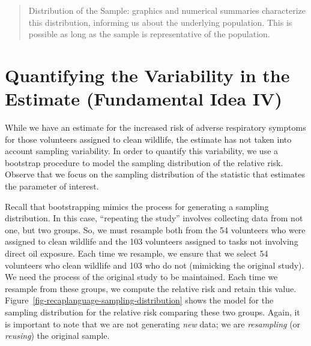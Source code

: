 \documentclass[
  letterpaper,
  DIV=11,
  numbers=noendperiod]{scrreprt}
\theoremstyle{definition}
\theoremstyle{definition}
\theoremstyle{plain}
\theoremstyle{remark}
\begin{document}
\begin{quote}
Distribution of the Sample: graphics and numerical summaries
characterize this distribution, informing us about the underlying
population. This is possible as long as the sample is representative of
the population.
\end{quote}

\hypertarget{quantifying-the-variability-in-the-estimate-fundamental-idea-iv}{%
\section{Quantifying the Variability in the Estimate (Fundamental Idea
IV)}\label{quantifying-the-variability-in-the-estimate-fundamental-idea-iv}}

While we have an estimate for the increased risk of adverse respiratory
symptoms for those volunteers assigned to clean wildlife, the estimate
has not taken into account sampling variability. In order to quantify
this variability, we use a bootstrap procedure to model the sampling
distribution of the relative risk. Observe that we focus on the sampling
distribution of the statistic that estimates the parameter of interest.

Recall that bootstrapping mimics the process for generating a sampling
distribution. In this case, ``repeating the study'' involves collecting
data from not one, but two groups. So, we must resample both from the 54
volunteers who were assigned to clean wildlife and the 103 volunteers
assigned to tasks not involving direct oil exposure. Each time we
resample, we ensure that we select 54 volunteers who clean wildlife and
103 who do not (mimicking the original study). We need the process of
the original study to be maintained. Each time we resample from these
groups, we compute the relative risk and retain this value.
Figure~\ref{fig-recaplanguage-sampling-distribution} shows the model for
the sampling distribution for the relative risk comparing these two
groups. Again, it is important to note that we are not generating
\emph{new} data; we are \emph{resampling} (or \emph{reusing}) the
original sample.
\end{document}
